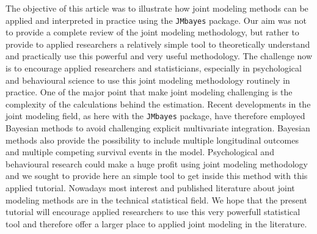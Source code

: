 \documentclass[12pt]{article}
\begin{document}
The objective of this article was to illustrate how joint modeling methods can be applied and interpreted in practice using the \texttt{JMbayes} package. Our aim was not to provide a complete review of the joint modeling methodology, but rather to provide to applied researchers a relatively simple tool to theoretically understand and practically use this powerful and very useful methodology.
The challenge now is to encourage applied researchers and statisticians, especially in psychological and behavioural science to use this joint modeling methodology routinely in practice.
One of the major point that make joint modeling challenging is the complexity of the calculations behind the estimation. Recent developments in the joint modeling field, as here with the \texttt{JMbayes} package, have therefore employed Bayesian methods to avoid challenging explicit multivariate integration. Bayesian methods also provide the possibility to include multiple longitudinal outcomes and multiple competing survival events in the model. Psychological and behavioural research could make a huge profit using joint modeling methodology and we sought to provide here an simple tool to get inside this method with this applied tutorial. Nowadays most interest and published literature about joint modeling methods are in the technical statistical field. We hope that the present tutorial will encourage applied researchers to use this very powerfull statistical tool and therefore offer a larger place to applied joint modeling in the literature.

\clearpage

\end{document}
